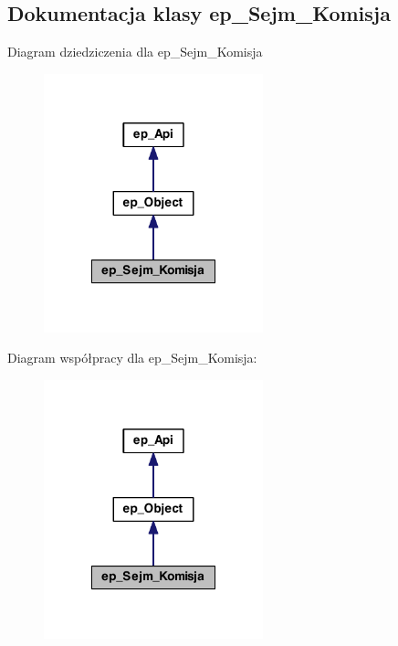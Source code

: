 \hypertarget{classep___sejm___komisja}{\subsection{Dokumentacja klasy ep\-\_\-\-Sejm\-\_\-\-Komisja}
\label{classep___sejm___komisja}
}


Diagram dziedziczenia dla ep\-\_\-\-Sejm\-\_\-\-Komisja\nopagebreak
\begin{figure}[H]
\begin{center}
\leavevmode
\includegraphics[width=180pt]{classep___sejm___komisja__inherit__graph}
\end{center}
\end{figure}


Diagram współpracy dla ep\-\_\-\-Sejm\-\_\-\-Komisja\-:\nopagebreak
\begin{figure}[H]
\begin{center}
\leavevmode
\includegraphics[width=180pt]{classep___sejm___komisja__coll__graph}
\end{center}
\end{figure}
